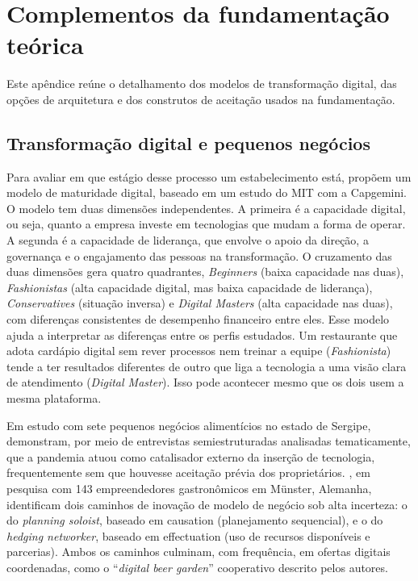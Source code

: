 \chapter{Complementos da fundamentação teórica}
\label{ap:fundamentacao}

Este apêndice reúne o detalhamento dos modelos de transformação digital, das opções de arquitetura e dos construtos de aceitação usados na fundamentação.

\section{Transformação digital e pequenos negócios}

Para avaliar em que estágio desse processo um estabelecimento está,  propõem um modelo de maturidade digital, baseado em um estudo do MIT com a Capgemini. O modelo tem duas dimensões independentes. A primeira é a capacidade digital, ou seja, quanto a empresa investe em tecnologias que mudam a forma de operar. A segunda é a capacidade de liderança, que envolve o apoio da direção, a governança e o engajamento das pessoas na transformação. O cruzamento das duas dimensões gera quatro quadrantes, \emph{Beginners} (baixa capacidade nas duas), \emph{Fashionistas} (alta capacidade digital, mas baixa capacidade de liderança), \emph{Conservatives} (situação inversa) e \emph{Digital Masters} (alta capacidade nas duas), com diferenças consistentes de desempenho financeiro entre eles. Esse modelo ajuda a interpretar as diferenças entre os perfis estudados. Um restaurante que adota cardápio digital sem rever processos nem treinar a equipe (\emph{Fashionista}) tende a ter resultados diferentes de outro que liga a tecnologia a uma visão clara de atendimento (\emph{Digital Master}). Isso pode acontecer mesmo que os dois usem a mesma plataforma.

Em estudo com sete pequenos negócios alimentícios no estado de Sergipe,  demonstram, por meio de entrevistas semiestruturadas analisadas tematicamente, que a pandemia atuou como catalisador externo da inserção de tecnologia, frequentemente sem que houvesse aceitação prévia dos proprietários. , em pesquisa com 143 empreendedores gastronômicos em Münster, Alemanha, identificam dois caminhos de inovação de modelo de negócio sob alta incerteza: o do \emph{planning soloist}, baseado em causation (planejamento sequencial), e o do \emph{hedging networker}, baseado em effectuation (uso de recursos disponíveis e parcerias). Ambos os caminhos culminam, com frequência, em ofertas digitais coordenadas, como o ``\emph{digital beer garden}'' cooperativo descrito pelos autores.

